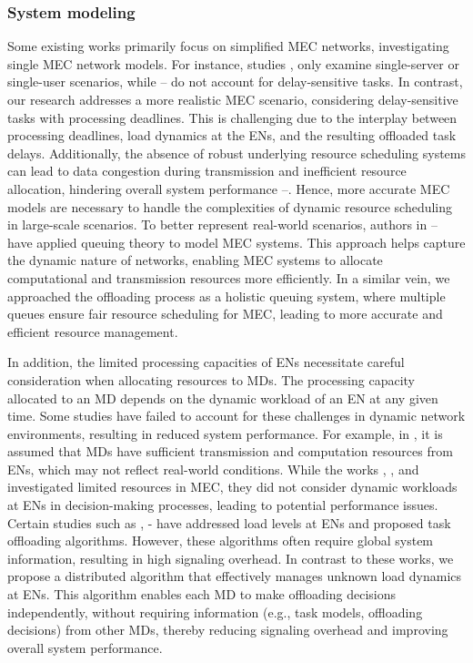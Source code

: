 \documentclass[12pt,draftclsnofoot,onecolumn]{IEEEtran}
\begin{document}
		\subsubsection{System modeling}
		
		Some existing works primarily focus on simplified MEC networks, investigating single MEC network models. For instance, studies \cite{zhou2021deep}, \cite{liu2021learn} only examine single-server or single-user scenarios, while \cite{huang2019deep}--\cite{wu2023computation} do not account for delay-sensitive tasks. In contrast, our research addresses a more realistic MEC scenario, considering delay-sensitive tasks with processing deadlines. This is challenging due to the interplay between processing deadlines, load dynamics at the ENs, and the resulting offloaded task delays. Additionally, the absence of robust underlying resource scheduling systems can lead to data congestion during transmission and inefficient resource allocation, hindering overall system performance \cite{wang2020reinforcement}--\cite{chen2021drl}. Hence, more accurate MEC models are necessary to handle the complexities of dynamic resource scheduling in large-scale scenarios.
		To better represent real-world scenarios, authors in \cite{Bolourian-WCL24}--\cite{9253665} have applied queuing theory to model MEC systems. This approach helps capture the dynamic nature of networks, enabling MEC systems to allocate computational and transmission resources more efficiently. In a similar vein, we approached the offloading process as a holistic queuing system, where multiple queues ensure fair resource scheduling for MEC, leading to more accurate and efficient resource management.
		
		In addition, the limited processing capacities of ENs necessitate careful consideration when allocating resources to MDs. The processing capacity allocated to an MD depends on the dynamic workload of an EN at any given time. Some studies have failed to account for these challenges in dynamic network environments, resulting in reduced system performance. For example, in \cite{chen2021drl}, it is assumed that MDs have sufficient transmission and computation resources from ENs, which may not reflect real-world conditions. While the works \cite{zhao2019deep}, \cite{dai2020edge}, and \cite{wu2024privacy} investigated limited resources in MEC, they did not consider dynamic workloads at ENs in decision-making processes, leading to potential performance issues.
		Certain studies such as \cite{sun2024hierarchical}, \cite{gong2022edge}-\cite{gao2022large} have addressed load levels at ENs and proposed task offloading algorithms. However, these algorithms often require global system information, resulting in high signaling overhead. In contrast to these works, we propose a distributed algorithm that effectively manages unknown load dynamics at ENs. This algorithm enables each MD to make offloading decisions independently, without requiring information (e.g., task models, offloading decisions) from other MDs, thereby reducing signaling overhead and improving overall system performance.
		
\end{document}
